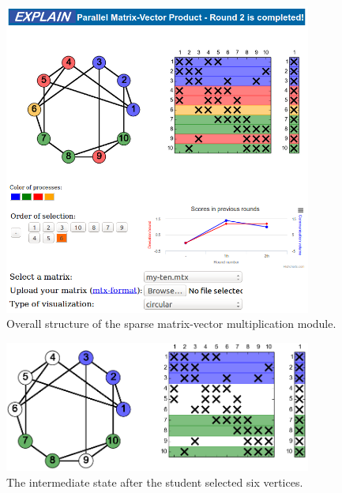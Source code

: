 \documentclass[12pt, oneside]{book}
\begin{document}
\begin{figure}[t]
\centering
\includegraphics[width=0.9\textwidth]{final}
\caption{Overall structure of the sparse matrix-vector multiplication module.}
\label{f.explain}
\end{figure}

\begin{figure}
\centering
\includegraphics[width=0.9\textwidth]{twoColors}
\caption{The intermediate state after the student selected six vertices.}
\label{f.beginning}
\end{figure}
\end{document}
